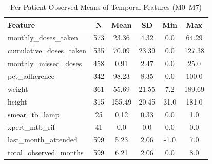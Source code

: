 \begin{table}[htbp]

\caption{Per-Patient Observed Means of Temporal Features (M0–M7)}
\label{tab:temporal_feature_descriptive_stats}
\begin{tabular}{lccccc}

\toprule

Feature & N & Mean & SD & Min & Max \\

\midrule

monthly\_doses\_taken & 573 & 23.36 & 4.32 & 0.0 & 64.29 \\
cumulative\_doses\_taken & 535 & 70.09 & 23.39 & 0.0 & 127.38 \\
monthly\_missed\_doses & 458 & 0.91 & 2.47 & 0.0 & 25.0 \\
pct\_adherence & 342 & 98.23 & 8.35 & 0.0 & 100.0 \\
weight & 361 & 55.69 & 21.55 & 7.2 & 189.69 \\
height & 315 & 155.49 & 20.45 & 31.0 & 181.0 \\
smear\_tb\_lamp & 25 & 0.12 & 0.33 & 0.0 & 1.0 \\
xpert\_mtb\_rif & 41 & 0.0 & 0.0 & 0.0 & 0.0 \\
last\_month\_attended & 599 & 5.23 & 2.06 & -1.0 & 7.0 \\
total\_observed\_months & 599 & 6.21 & 2.06 & 0.0 & 8.0 \\

\bottomrule

\end{tabular}

\end{table}